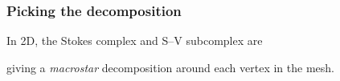 \documentclass[presentation,aspectratio=43, 10pt]{beamer}
\let\div\relax
\DeclareMathOperator{\div}{div}
\DeclareMathOperator{\curl}{curl}
\begin{document}
\begin{frame}[fragile]
  \frametitle{Picking the decomposition}
  In 2D, the Stokes complex and S--V subcomplex are
  \begin{center}
    
  \end{center}
  giving a \emph{macrostar} decomposition around each vertex in the mesh.
  \begin{center}
    
  \end{center}
\end{frame}
\end{document}
